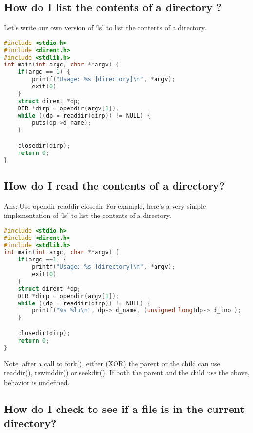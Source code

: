 \subsection{How do I list the contents of a directory ?}\label{how-do-i-list-the-contents-of-a-directory}

Let's write our own version of `ls' to list the contents of a directory.

\begin{lstlisting}[language=C]
#include <stdio.h>
#include <dirent.h>
#include <stdlib.h>
int main(int argc, char **argv) {
    if(argc == 1) {
        printf("Usage: %s [directory]\n", *argv);
        exit(0);
    }
    struct dirent *dp;
    DIR *dirp = opendir(argv[1]);
    while ((dp = readdir(dirp)) != NULL) {
        puts(dp->d_name);
    }

    closedir(dirp);
    return 0;
}
\end{lstlisting}

\subsection{How do I read the contents of a directory?}\label{how-do-i-read-the-contents-of-a-directory}

Ans: Use opendir readdir closedir For example, here's a very simple implementation of `ls' to list the contents of a directory.

\begin{lstlisting}[language=C]
#include <stdio.h>
#include <dirent.h>
#include <stdlib.h>
int main(int argc, char **argv) {
    if(argc ==1) {
        printf("Usage: %s [directory]\n", *argv);
        exit(0);
    }
    struct dirent *dp;
    DIR *dirp = opendir(argv[1]);
    while ((dp = readdir(dirp)) != NULL) {
        printf("%s %lu\n", dp-> d_name, (unsigned long)dp-> d_ino );
    }

    closedir(dirp);
    return 0;
}
\end{lstlisting}

Note: after a call to fork(), either (XOR) the parent or the child can use readdir(), rewinddir() or seekdir(). If both the parent and the child use the above, behavior is undefined.

\subsection{How do I check to see if a file is in the current directory?}\label{how-do-i-check-to-see-if-a-file-is-in-the-current-directory}


